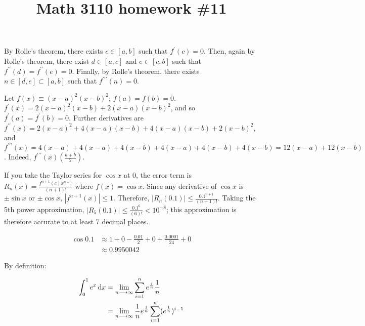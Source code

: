 

\title{Math 3110 homework \#11}
\author{\name}
\maketitle


 By Rolle's theorem, there exists $c \in [a, b]$ such that $f^{\prime}(c) = 0$. Then, again by Rolle's theorem, there exist $d \in [a, c]$ and $e \in [c, b]$ such that $f^{\prime\prime}(d) = f^{\prime\prime}(e) = 0$. Finally, by Rolle's theorem, there exists $n \in [d, e] \subset [a, b]$ such that $f^{\prime\prime\prime}(n) = 0$.

 Let $f(x) \equiv (x - a)^2(x - b)^2$; $f(a) = f(b) = 0$. $f^{\prime}(x) = 2(x - a)^2(x - b) + 2(x - a)(x - b)^2$, and so $f^{\prime}(a) = f^{\prime}(b) = 0$. Further derivatives are $f^{\prime\prime}(x) = 2(x - a)^2 + 4(x - a)(x - b) + 4(x - a)(x - b) + 2(x - b)^2$, and $f^{\prime\prime\prime}(x) = 4(x - a) + 4(x - a) + 4(x - b) + 4(x - a) + 4(x - b) + 4(x - b) = 12(x - a) + 12(x - b)$. Indeed, $f^{\prime\prime\prime}(x)\left(\frac{a + b}{2}\right)$.


If you take the Taylor series for $\cos x$ at 0, the error term is $R_n(x) = \frac{f^{n + 1}(c)x^{n + 1}}{(n + 1)!}$ where $f(x) = \cos x$. Since any derivative of $\cos x$ is $\pm \sin x$ or $\pm \cos x$, $|f^{n + 1}(x)| \leq 1$. Therefore, $|R_n(0.1)| \leq \frac{0.1^{n + 1}}{(n + 1)!}$. Taking the 5th power approximation, $|R_5(0.1)| \leq \frac{0.1^{6}}{(6)!} < 10^{-8}$; this approximation is therefore accurate to at least 7 decimal places.

\begin{align*}
  \cos 0.1 &\approx 1 + 0 - \frac{0.01}{2} + 0 + \frac{0.0001}{24} + 0 \\
  &\approx 0.9950042
\end{align*}


By definition:

\begin{align*}
  \int_0^1 e^{x} \mathop{}\!\mathrm{d} x &= \lim_{n \longrightarrow \infty} \sum_{i = 1}^n e^{\frac{i}{n}} \frac{1}{n} \\
  &= \lim_{n \longrightarrow \infty} \frac{1}{n} e^{\frac{1}{n}} \sum_{i = 1}^{n} (e^{\frac{1}{n}})^{i - 1}
\end{align*}

